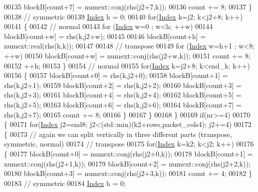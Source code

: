 \begin{DoxyCode}
00135           blockB[count+7] = numext::conj(rhs(j2+7,k));
00136           count += 8;
00137         \}
00138         \textcolor{comment}{// symmetric}
00139         \hyperlink{namespace_eigen_a62e77e0933482dafde8fe197d9a2cfde}{Index} h = 0;
00140         \textcolor{keywordflow}{for}(\hyperlink{namespace_eigen_a62e77e0933482dafde8fe197d9a2cfde}{Index} k=j2; k<j2+8; k++)
00141         \{
00142           \textcolor{comment}{// normal}
00143           \textcolor{keywordflow}{for} (\hyperlink{namespace_eigen_a62e77e0933482dafde8fe197d9a2cfde}{Index} w=0 ; w<h; ++w)
00144             blockB[count+w] = rhs(k,j2+w);
00145 
00146           blockB[count+h] = numext::real(rhs(k,k));
00147 
00148           \textcolor{comment}{// transpose}
00149           \textcolor{keywordflow}{for} (\hyperlink{namespace_eigen_a62e77e0933482dafde8fe197d9a2cfde}{Index} w=h+1 ; w<8; ++w)
00150             blockB[count+w] = numext::conj(rhs(j2+w,k));
00151           count += 8;
00152           ++h;
00153         \}
00154         \textcolor{comment}{// normal}
00155         \textcolor{keywordflow}{for}(\hyperlink{namespace_eigen_a62e77e0933482dafde8fe197d9a2cfde}{Index} k=j2+8; k<end\_k; k++)
00156         \{
00157           blockB[count+0] = rhs(k,j2+0);
00158           blockB[count+1] = rhs(k,j2+1);
00159           blockB[count+2] = rhs(k,j2+2);
00160           blockB[count+3] = rhs(k,j2+3);
00161           blockB[count+4] = rhs(k,j2+4);
00162           blockB[count+5] = rhs(k,j2+5);
00163           blockB[count+6] = rhs(k,j2+6);
00164           blockB[count+7] = rhs(k,j2+7);
00165           count += 8;
00166         \}
00167       \}
00168     \}
00169     \textcolor{keywordflow}{if}(nr>=4)
00170     \{
00171       \textcolor{keywordflow}{for}(\hyperlink{namespace_eigen_a62e77e0933482dafde8fe197d9a2cfde}{Index} j2=end8; j2<(std::min)(k2+rows,packet\_cols4); j2+=4)
00172       \{
00173         \textcolor{comment}{// again we can split vertically in three different parts (transpose, symmetric, normal)}
00174         \textcolor{comment}{// transpose}
00175         \textcolor{keywordflow}{for}(\hyperlink{namespace_eigen_a62e77e0933482dafde8fe197d9a2cfde}{Index} k=k2; k<j2; k++)
00176         \{
00177           blockB[count+0] = numext::conj(rhs(j2+0,k));
00178           blockB[count+1] = numext::conj(rhs(j2+1,k));
00179           blockB[count+2] = numext::conj(rhs(j2+2,k));
00180           blockB[count+3] = numext::conj(rhs(j2+3,k));
00181           count += 4;
00182         \}
00183         \textcolor{comment}{// symmetric}
00184         \hyperlink{namespace_eigen_a62e77e0933482dafde8fe197d9a2cfde}{Index} h = 0;

\end{DoxyCode}
